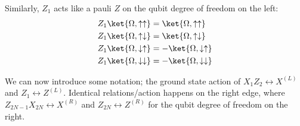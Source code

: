 Similarly, $Z_1$ acts like a pauli $Z$ on the qubit degree of freedom on the left:
\begin{equation}
    \begin{split}
        Z_1\ket{\Omega, \uparrow\uparrow} &= \ket{\Omega, \uparrow\uparrow}
        \\ Z_1\ket{\Omega, \uparrow\downarrow} &= \ket{\Omega, \uparrow\downarrow} 
        \\ Z_1\ket{\Omega, \downarrow\uparrow} &= -\ket{\Omega, \downarrow\uparrow}
        \\ Z_1\ket{\Omega, \downarrow\downarrow} &= -\ket{\Omega, \downarrow\downarrow}
    \end{split}
\end{equation}


We can now introduce some notation; the ground state action of $X_1Z_2 \leftrightarrow X^{(L)}$ and $Z_1 \leftrightarrow Z^{(L)}$. Identical relations/action happens on the right edge, where $Z_{2N-1}X_{2N} \leftrightarrow X^{(R)}$ and $Z_{2N} \leftrightarrow Z^{(R)}$ for the qubit degree of freedom on the right.

